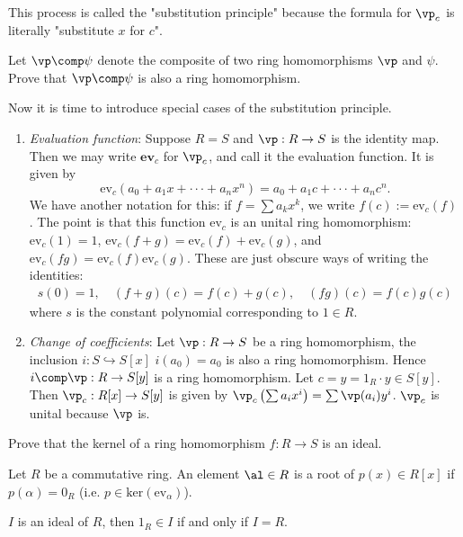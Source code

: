 \documentclass[10pt]{article}
\begin{document}
\par
This process is called the "substitution principle" because the formula for $\vp_c$ is literally "substitute $x$ for $c$".
\begin{problem}
    Let $\vp\comp\psi$ denote the composite of two ring homomorphisms $\vp$ and $\psi$. Prove that $\vp\comp\psi$ is also a ring homomorphism.
\end{problem}
\begin{example}
    Now it is time to introduce special cases of the substitution principle.
    \begin{enumerate}
        \item[] \textit{Evaluation function}: Suppose $R = S$ and $\vp: R \to S$ is the identity map. Then we may write $\textbf{ev}_c$ for $\vp_c$, and call it the evaluation function. It is given by
        $$
            \text{ev}_c(a_0 +a_1x+···+a_nx^n)=a_0 +a_1c+···+a_nc^n.
        $$
        We have another notation for this: if $f =\sum a_kx^k$, we write $f(c) := \text{ev}_c(f)$. The point is that this function ev$_c$ is an unital ring homomorphism: $\text{ev}_c(1) = 1$, $\text{ev}_c(f + g) = \text{ev}_c(f) + \text{ev}_c(g)$, and $\text{ev}_c(fg) = \text{ev}_c(f) \text{ev}_c(g)$. These are just obscure ways of writing the identities:
        \begin{align*}
            s(0) = 1,\quad (f + g)(c) = f(c) + g(c),\quad (fg)(c) = f(c)g(c)
        \end{align*}
        where $s$ is the constant polynomial corresponding to $1 \in R$.
        \item[] \textit{Change of coefficients}: Let $\vp:R\to S$ be a ring homomorphism, the inclusion $i: S\hookrightarrow S[x]$ $i(a_0)=a_0$ is also a ring homomorphism. Hence $i\comp\vp:R\to S[y]$ is a ring homomorphism. Let $c=y=1_R\cdot y\in S[y]$. Then $\vp_c:R[x]\to S[y]$ is given by $\vp_c\left(\sum a_ix^i\right)=\sum \vp(a_i)y^i$. $\vp_c$ is unital because $\vp$ is.
    \end{enumerate}
\end{example}
\begin{problem}
    Prove that the kernel of a ring homomorphism $f:R\to S$ is an ideal.
\end{problem}
\begin{definition}
    Let $R$ be a commutative ring. An element $\al\in R$ is a root of $p(x)\in R[x]$ if $p(\alpha)=0_{R}$ (i.e. $p\in \text{ker}(\text{ev}_{\alpha})$).
\end{definition}
\begin{lemma}
    $I$ is an ideal of $R$, then $1_{R}\in I$ if and only if $ I=R$.
\end{lemma}
\end{document}

